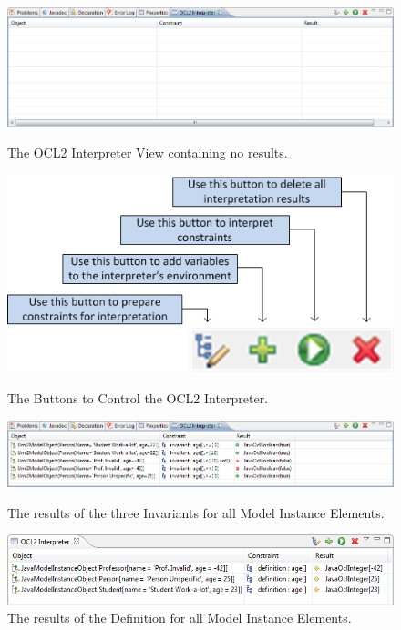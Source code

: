\begin{figure}[!p]
	\centering
	\includegraphics[width=1.0\linewidth]{figures/interpreter/interpret01}
	\caption{The OCL2 Interpreter View containing no results.}
	\label{pic:interpret:interpret01}

  \vspace{3.0em}
  
	\centering
	\includegraphics[width=0.5\linewidth]{figures/interpreter/interpret02}
	\caption{The Buttons to Control the OCL2 Interpreter.}
	\label{pic:interpret:interpret02}

  \vspace{3.0em}

	\centering
	\includegraphics[width=1.0\linewidth]{figures/interpreter/interpret04}
	\caption{The results of the three Invariants for all Model Instance Elements.}
	\label{pic:interpret:interpret04}

  \vspace{3.0em}

	\centering
	\includegraphics[width=1.0\linewidth]{figures/interpreter/interpret07}
	\caption{The results of the Definition for all Model Instance Elements.}
	\label{pic:interpret:interpret07}

\end{figure}


